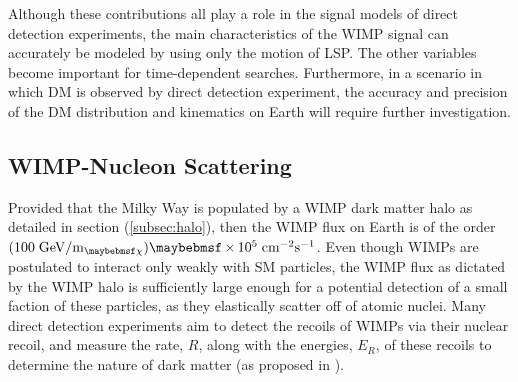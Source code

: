 Although these contributions all play a role in the signal models of direct detection experiments, the main characteristics of the WIMP signal can accurately be modeled by using only the motion of LSP. The other variables become important for time-dependent searches. Furthermore, in a scenario in which DM is observed by direct detection experiment, the accuracy and precision of the DM distribution and kinematics on Earth will require further investigation. 


\subsection{WIMP-Nucleon Scattering}
\label{subsec:scattering}

Provided that the Milky Way is populated by a WIMP dark matter halo as detailed in section (\ref{subsec:halo}), then the WIMP flux on Earth is of the order $(100 \; \MathText{GeV}/\MathText{m}_{\chi}) \times 10^5  \; \MathText{cm}^{-2} \MathText{s}^{-1}$. Even though WIMPs are postulated to interact only weakly with SM particles, the WIMP flux as dictated by the WIMP halo is sufficiently large enough for a potential detection of a small faction of these particles, as they elastically scatter off of atomic nuclei. Many direct detection experiments aim to detect the recoils of WIMPs via their nuclear recoil, and measure the rate, $R$, along with the energies, $E_{R}$, of these recoils to determine the nature of dark matter (as proposed in  \cite{Detectability_of_dm}).

